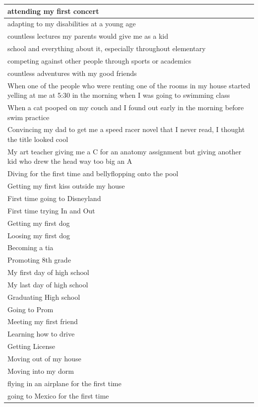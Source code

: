 \documentclass[
  .7em,
  letterpaper,
  DIV=11,
  numbers=noendperiod]{scrartcl}
\begin{document}
\begin{table}
\begin{tabular}{l}
\hline
attending my first concert\\
\hline
adapting to my disabilities at a young age\\
\hline
countless lectures my parents would give me as a kid\\
\hline
school and everything about it, especially throughout elementary\\
\hline
competing against other people through sports or academics\\
\hline
countless adventures with my good friends\\
\hline
When one of the people who were renting one of the rooms in my house started yelling at me at 5:30 in the morning when I was going to swimming class\\
\hline
When a cat pooped on my couch and I found out early in the morning before swim practice\\
\hline
Convincing my dad to get me a speed racer novel that I never read, I thought the title looked cool\\
\hline
My art teacher giving me a C for an anatomy assignment but giving another kid who drew the head way too big an A\\
\hline
Diving for the first time and bellyflopping onto the pool\\
\hline
Getting my first kiss outside my house\\
\hline
First time going to Disneyland\\
\hline
First time trying In and Out\\
\hline
Getting my first dog\\
\hline
Loosing my first dog\\
\hline
Becoming a tia\\
\hline
Promoting 8th grade\\
\hline
My first day of high school\\
\hline
My last day of high school\\
\hline
Graduating High school\\
\hline
Going to Prom\\
\hline
Meeting my first friend\\
\hline
Learning how to drive\\
\hline
Getting License\\
\hline
Moving out of my house\\
\hline
Moving into my dorm\\
\hline
flying in an airplane for the first time\\
\hline
going to Mexico for the first time\\

\end{tabular}
\end{table}
\end{document}
